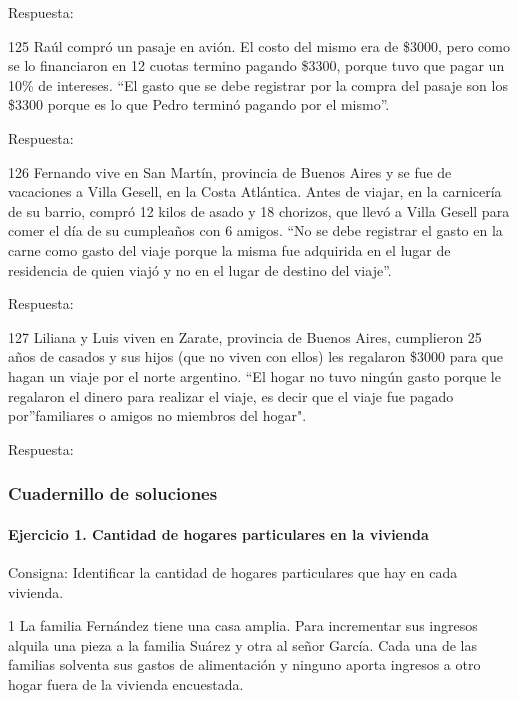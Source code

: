\documentclass[
  openany]{book}
\begin{document}
Respuesta:

125 Raúl compró un pasaje en avión. El costo del mismo era de \$3000, pero como se lo financiaron en 12 cuotas termino pagando \$3300, porque tuvo que pagar un 10\% de intereses. ``El gasto que se debe registrar por la compra del pasaje son los \$3300 porque es lo que Pedro terminó pagando por el mismo''.

Respuesta:

126 Fernando vive en San Martín, provincia de Buenos Aires y se fue de vacaciones a Villa Gesell, en la Costa Atlántica. Antes de viajar, en la carnicería de su barrio, compró 12 kilos de asado y 18 chorizos, que llevó a Villa Gesell para comer el día de su cumpleaños con 6 amigos. ``No se debe registrar el gasto en la carne como gasto del viaje porque la misma fue adquirida en el lugar de residencia de quien viajó y no en el lugar de destino del viaje''.

Respuesta:

127 Liliana y Luis viven en Zarate, provincia de Buenos Aires, cumplieron 25 años de casados y sus hijos (que no viven con ellos) les regalaron \$3000 para que hagan un viaje por el norte argentino. ``El hogar no tuvo ningún gasto porque le regalaron el dinero para realizar el viaje, es decir que el viaje fue pagado por''familiares o amigos no miembros del hogar".

Respuesta:

\hypertarget{cuadernillo-de-soluciones}{%
\subsubsection{Cuadernillo de soluciones}\label{cuadernillo-de-soluciones}}

\hypertarget{ejercicio-1.-cantidad-de-hogares-particulares-en-la-vivienda-1}{%
\paragraph{Ejercicio 1. Cantidad de hogares particulares en la vivienda}\label{ejercicio-1.-cantidad-de-hogares-particulares-en-la-vivienda-1}}

Consigna: Identificar la cantidad de hogares particulares que hay en cada vivienda.

1 La familia Fernández tiene una casa amplia. Para incrementar sus ingresos alquila una pieza a la familia Suárez y otra al señor García. Cada una de las familias solventa sus gastos de alimentación y ninguno aporta ingresos a otro hogar fuera de la vivienda encuestada.
\end{document}
